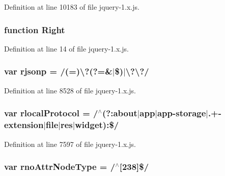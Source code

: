 Definition at line 10183 of file jquery-\/1.\+x.\+js.

\subsubsection[{\texorpdfstring{Right}{Right}}]{\setlength{\rightskip}{0pt plus 5cm}function Right}\hypertarget{jquery-1_8x_8js_ac7f66efc33d974809d85fc5bdb00c6eb}{}\label{jquery-1_8x_8js_ac7f66efc33d974809d85fc5bdb00c6eb}


Definition at line 14 of file jquery-\/1.\+x.\+js.

\subsubsection[{\texorpdfstring{rjsonp}{rjsonp}}]{\setlength{\rightskip}{0pt plus 5cm}var rjsonp = /(=)\textbackslash{}?(?=\&$\vert$\$)$\vert$\textbackslash{}?\textbackslash{}?/}\hypertarget{jquery-1_8x_8js_a8b62e46075611fd1fc0bbb78b14d113a}{}\label{jquery-1_8x_8js_a8b62e46075611fd1fc0bbb78b14d113a}


Definition at line 8528 of file jquery-\/1.\+x.\+js.

\subsubsection[{\texorpdfstring{rlocal\+Protocol}{rlocalProtocol}}]{\setlength{\rightskip}{0pt plus 5cm}var rlocal\+Protocol = /$^\wedge$(?\+:about$\vert$app$\vert$app-\/storage$\vert$.+-\/extension$\vert${\bf file}$\vert${\bf res}$\vert${\bf widget})\+:\$/}\hypertarget{jquery-1_8x_8js_af4dd13c90298bbf53ce08ec707dc9e2a}{}\label{jquery-1_8x_8js_af4dd13c90298bbf53ce08ec707dc9e2a}


Definition at line 7597 of file jquery-\/1.\+x.\+js.

\subsubsection[{\texorpdfstring{rno\+Attr\+Node\+Type}{rnoAttrNodeType}}]{\setlength{\rightskip}{0pt plus 5cm}var rno\+Attr\+Node\+Type = /$^\wedge$\mbox{[}238\mbox{]}\$/}\hypertarget{jquery-1_8x_8js_a932e5ad53b24a286714fcffceb4cbde0}{}\label{jquery-1_8x_8js_a932e5ad53b24a286714fcffceb4cbde0}


